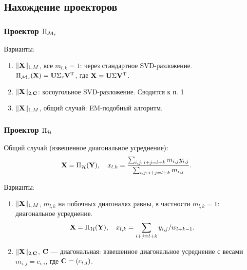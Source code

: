 \documentclass[unicode, notheorems]{beamer}
\begin{document}
\subsection{Нахождение проекторов}
\begin{frame}
	\frametitle{Проектор $\Pi_{\mathcal{M}_r}$}
	Варианты:
	\begin{enumerate}
		\item $\|\mathbf{X}\|_{1, M}$, все $m_{l, k} = 1$: через стандартное SVD-разложение. $\Pi_{\mathcal{M}_r}(\mathbf{X}) = \mathbf{U} \Sigma_r \mathbf{V}^{\mathrm{T}}$, где $\mathbf{X} = \mathbf{U} \Sigma \mathbf{V}^{\mathrm{T}}$.
		
		\vspace{0.2cm}
		\item $\|\mathbf{X}\|_{2, \mathbf{C}}$: косоугольное SVD-разложение. Сводится к п. 1
		
		\vspace{0.2cm}
		\item $\|\mathbf{X}\|_{1, M}$, общий случай: EM-подобный алгоритм.

	\end{enumerate}
\end{frame}

\begin{frame}
	\frametitle{Проектор $\Pi_{\mathcal{H}}$}
	Общий случай (взвешенное диагональное усреднение):
	\begin{equation*}
		\mathbf{X} = \Pi_{\mathcal{H}}(\mathbf{Y}), \quad x_{l,k} = \frac{\sum_{i,j:\, i+j=l+k} m_{i, j} y_{i,j}}{\sum_{i,j:\, i+j=l+k} m_{i,j}}.
	\end{equation*}
		
	Варианты:
	\begin{enumerate}
		\item $\|\mathbf{X}\|_{1, M}$, $m_{l,k}$ на побочных диагоналях равны, в частности $m_{l, k} = 1$: диагональное усреднение.
		\begin{equation*}
		\mathbf{X} = \Pi_{\mathcal{H}}(\mathbf{Y}), \quad x_{l,k} = \sum_{i + j = l + k} y_{i, j} / w_{l + k - 1}.
		\end{equation*}
		\item $\|\mathbf{X}\|_{2, \mathbf{C}}$, $\mathbf{C}$ --- диагональная: взвешенное диагональное усреднение с весами $m_{i,j} = c_{i, i}$, где $\mathbf{C} = (c_{i, j})$.
		
	\end{enumerate}
\end{frame}
\end{document}
